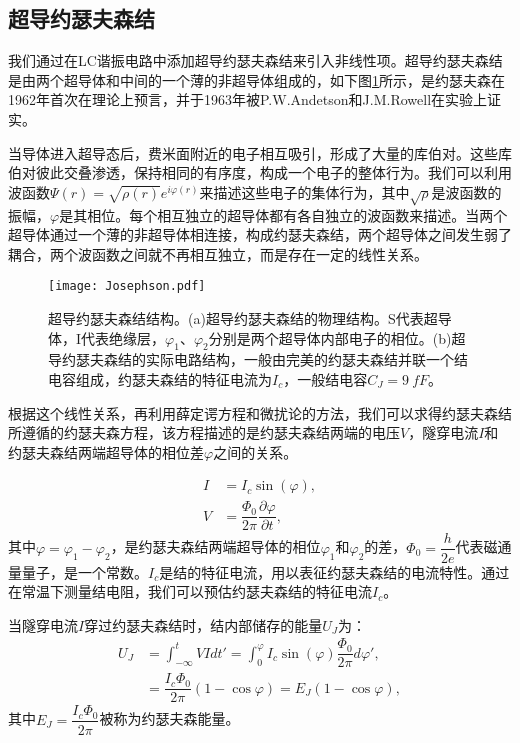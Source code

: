 \subsection{超导约瑟夫森结}
我们通过在LC谐振电路中添加超导约瑟夫森结来引入非线性项。超导约瑟夫森结是由两个超导体和中间的一个薄的非超导体组成的，如下图\ref{fig:Josephson}所示，是约瑟夫森在1962年首次在理论上预言\cite{josephson1962possible}，并于1963年被P.W.Andetson和J.M.Rowell在实验上证实\cite{anderson1963probable}。

当导体进入超导态后，费米面附近的电子相互吸引，形成了大量的库伯对。这些库伯对彼此交叠渗透，保持相同的有序度，构成一个电子的整体行为。我们可以利用波函数$ \Psi(r)=\sqrt{\rho(r)}{e}^{{i}\varphi(r)}$来描述这些电子的集体行为，其中$ \sqrt{\rho}$是波函数的振幅，$ \varphi$是其相位。每个相互独立的超导体都有各自独立的波函数来描述。当两个超导体通过一个薄的非超导体相连接，构成约瑟夫森结，两个超导体之间发生弱了耦合，两个波函数之间就不再相互独立，而是存在一定的线性关系。
\begin{figure}[h]
	\centering
	\texttt{[image: Josephson.pdf]}
	\caption{超导约瑟夫森结结构。(a)超导约瑟夫森结的物理结构。S代表超导体，I代表绝缘层，$ \varphi_{1}$、$ \varphi_{2}$分别是两个超导体内部电子的相位。(b)超导约瑟夫森结的实际电路结构，一般由完美的约瑟夫森结并联一个结电容组成，约瑟夫森结的特征电流为$ I_{c}$，一般结电容$ C_{J}= 9\ {fF}$。}
	\label{fig:Josephson}
\end{figure}

根据这个线性关系，再利用薛定谔方程和微扰论的方法，我们可以求得约瑟夫森结所遵循的约瑟夫森方程，该方程描述的是约瑟夫森结两端的电压$ V$，隧穿电流$ I$和约瑟夫森结两端超导体的相位差$\varphi$之间的关系\cite{clarke2003squid}。

\begin{align}
	\label{josephsonI} I &=  I_{c}\sin(\varphi), \\
	\label{josephsonV}  V &=  \dfrac{\Phi_{0}}{2\pi}\dfrac{\partial\varphi}{\partial t}, 
\end{align}
其中$ \varphi=\varphi_{1}-\varphi_{2}$，是约瑟夫森结两端超导体的相位$ \varphi_{1}$和$\varphi_{2}$的差，$ \Phi_{0}=\dfrac{{h}}{{2e}}$代表磁通量量子，是一个常数。$ I_{c}$是结的特征电流，用以表征约瑟夫森结的电流特性。通过在常温下测量结电阻，我们可以预估约瑟夫森结的特征电流$ I_{c}$。

当隧穿电流$ I$穿过约瑟夫森结时，结内部储存的能量$ U_{J}$为：
\begin{equation}
	\begin{split}
		U_{J} &=  \int_{-\infty}^{t} VIdt' = \int_{0}^{\varphi} I_{c}\sin(\varphi)\dfrac{\Phi_{0}}{2\pi}d\varphi' ,\\
		& =  \dfrac{I_{c}\Phi_{0}}{2\pi}\left( 1- \cos\varphi\right)=E_{J}\left(1- \cos\varphi\right),
	\end{split}		
\end{equation}
其中$ E_{J} = \dfrac{I_{c}\Phi_{0}}{2\pi}$被称为约瑟夫森能量。

